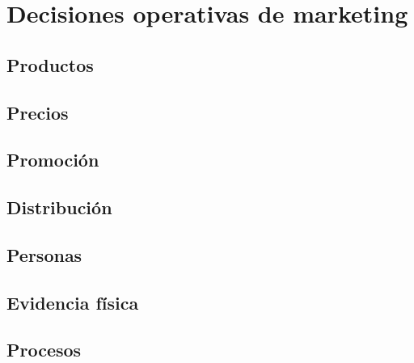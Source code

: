 \chapter{Decisiones operativas de marketing}

\section{Productos}

\section{Precios}

\section{Promoción}

\section{Distribución}

\section{Personas}

\section{Evidencia física}

\section{Procesos}